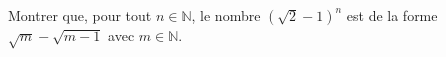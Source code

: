 Montrer que, pour tout $n \in \mathbb{N}$, le nombre $\left(\sqrt{2} - 1\right)^n$ est de la forme $\sqrt{m} - \sqrt{m - 1}$ avec $m \in \mathbb{N}$.
